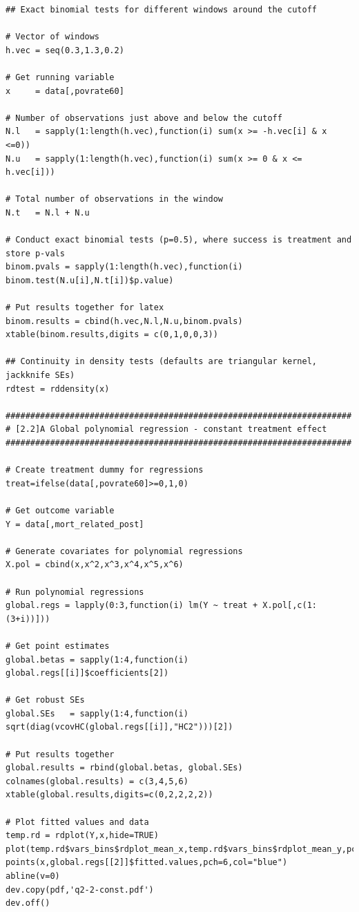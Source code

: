 \documentclass[12pt]{article}
\begin{document}
\begin{verbatim}
## Exact binomial tests for different windows around the cutoff

# Vector of windows
h.vec = seq(0.3,1.3,0.2)

# Get running variable
x     = data[,povrate60]

# Number of observations just above and below the cutoff
N.l   = sapply(1:length(h.vec),function(i) sum(x >= -h.vec[i] & x <=0))
N.u   = sapply(1:length(h.vec),function(i) sum(x >= 0 & x <= h.vec[i]))

# Total number of observations in the window
N.t   = N.l + N.u

# Conduct exact binomial tests (p=0.5), where success is treatment and store p-vals
binom.pvals = sapply(1:length(h.vec),function(i) binom.test(N.u[i],N.t[i])$p.value)

# Put results together for latex
binom.results = cbind(h.vec,N.l,N.u,binom.pvals)
xtable(binom.results,digits = c(0,1,0,0,3))

## Continuity in density tests (defaults are triangular kernel, jackknife SEs)
rdtest = rddensity(x)

######################################################################
# [2.2]A Global polynomial regression - constant treatment effect
######################################################################

# Create treatment dummy for regressions
treat=ifelse(data[,povrate60]>=0,1,0)

# Get outcome variable
Y = data[,mort_related_post]

# Generate covariates for polynomial regressions
X.pol = cbind(x,x^2,x^3,x^4,x^5,x^6)

# Run polynomial regressions
global.regs = lapply(0:3,function(i) lm(Y ~ treat + X.pol[,c(1:(3+i))]))

# Get point estimates
global.betas = sapply(1:4,function(i) global.regs[[i]]$coefficients[2])

# Get robust SEs
global.SEs   = sapply(1:4,function(i) sqrt(diag(vcovHC(global.regs[[i]],"HC2")))[2])

# Put results together
global.results = rbind(global.betas, global.SEs)
colnames(global.results) = c(3,4,5,6)
xtable(global.results,digits=c(0,2,2,2,2))

# Plot fitted values and data
temp.rd = rdplot(Y,x,hide=TRUE)
plot(temp.rd$vars_bins$rdplot_mean_x,temp.rd$vars_bins$rdplot_mean_y,pch=20,xlab="povrate60",ylab="mort_related_post")
points(x,global.regs[[2]]$fitted.values,pch=6,col="blue")
abline(v=0)
dev.copy(pdf,'q2-2-const.pdf')
dev.off()


\end{verbatim}
\end{document}
